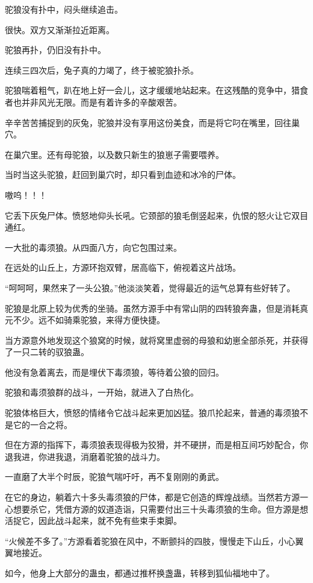 \begin{this_body}
驼狼没有扑中，闷头继续追击。

很快。双方又渐渐拉近距离。

驼狼再扑，仍旧没有扑中。

连续三四次后，兔子真的力竭了，终于被驼狼扑杀。

驼狼喘着粗气，趴在地上好一会儿，这才缓缓地站起来。在这残酷的竞争中，猎食者也并非风光无限。而是有着许多的辛酸艰苦。

辛辛苦苦捕捉到的灰兔，驼狼并没有享用这份美食，而是将它叼在嘴里，回往巢穴。

在巢穴里。还有母驼狼，以及数只新生的狼崽子需要喂养。

当时当这头驼狼，赶回到巢穴时，却只看到血迹和冰冷的尸体。

嗷呜！！！

它丢下灰兔尸体。愤怒地仰头长吼。它颈部的狼毛倒竖起来，仇恨的怒火让它双目通红。

一大批的毒须狼。从四面八方，向它包围过来。

在远处的山丘上，方源环抱双臂，居高临下，俯视着这片战场。

“呵呵呵，果然来了一头公狼。”他淡淡笑着，觉得最近的运气总算有些好转了。

驼狼是北原上较为优秀的坐骑。虽然方源手中有常山阴的四转狼奔蛊，但是消耗真元不少。远不如骑乘驼狼，来得方便快捷。

当方源意外地发现这个狼窝的时候，就将窝里虚弱的母狼和幼崽全部杀死，并获得了一只二转的驭狼蛊。

他没有急着离去，而是埋伏下毒须狼，等待着公狼的回归。

驼狼和毒须狼群的战斗，一开始，就进入了白热化。

驼狼体格巨大，愤怒的情绪令它战斗起来更加凶猛。狼爪抡起来，普通的毒须狼不是它的一合之将。

但在方源的指挥下，毒须狼表现得极为狡猾，并不硬拼，而是相互间巧妙配合，你退我进，你进我退，消磨着驼狼的战斗力。

一直磨了大半个时辰，驼狼气喘吁吁，再不复刚刚的勇武。

在它的身边，躺着六十多头毒须狼的尸体，都是它创造的辉煌战绩。当然若方源一心想要杀它，凭借方源的奴道造诣，只需要付出三十头毒须狼的生命。但方源是想活捉它，因此战斗起来，就不免有些束手束脚。

“火候差不多了。”方源看着驼狼在风中，不断颤抖的四肢，慢慢走下山丘，小心翼翼地接近。

如今，他身上大部分的蛊虫，都通过推杯换盏蛊，转移到狐仙福地中了。


\end{this_body}

